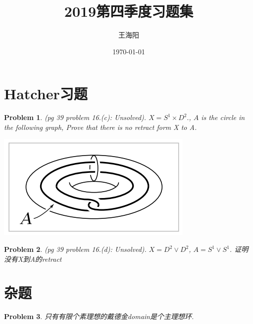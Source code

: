 \documentclass{article}
\newtheorem{problem}{Problem}
\begin{document}
\title{2019第四季度习题集}
\author{王海阳}
\date{\today}
\maketitle
\tableofcontents

    \section{Hatcher习题}
        \begin{problem}
            (pg 39 problem 16.(c): Unsolved).
            \(X = S^1\times D^2.\), \(A\) is the circle in the following graph,
            Prove that there is no retract form X to A.
            \begin{center}
                \includegraphics{hatcher习题截图.png}
            \end{center}
        \end{problem}

        \begin{problem}
            (pg 39 problem 16.(d): Unsolved).
            \(X = D^2 \vee D^2\), \(A = S^1 \vee S^1\). 证明没有X到A的retract
        \end{problem}

    \section{杂题}
        \begin{problem}
            只有有限个素理想的戴德金domain是个主理想环.
        \end{problem}

        





\end{document}
